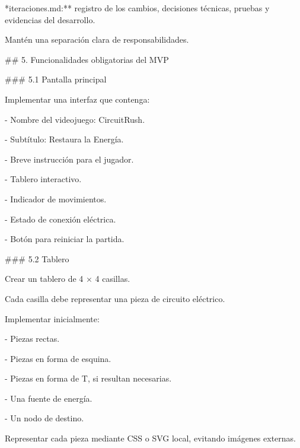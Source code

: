 \par\smallskip
\noindent **iteraciones.md:** registro de los cambios, decisiones técnicas, pruebas y evidencias del desarrollo.\par
\par\smallskip
\noindent Mantén una separación clara de responsabilidades.\par
\par\smallskip
\noindent \#\# 5. Funcionalidades obligatorias del MVP\par
\par\smallskip
\noindent \#\#\# 5.1 Pantalla principal\par
\par\smallskip
\noindent Implementar una interfaz que contenga:\par
\par\smallskip
\noindent - Nombre del videojuego: CircuitRush.\par
\noindent - Subtítulo: Restaura la Energía.\par
\noindent - Breve instrucción para el jugador.\par
\noindent - Tablero interactivo.\par
\noindent - Indicador de movimientos.\par
\noindent - Estado de conexión eléctrica.\par
\noindent - Botón para reiniciar la partida.\par
\par\smallskip
\noindent \#\#\# 5.2 Tablero\par
\par\smallskip
\noindent Crear un tablero de 4 × 4 casillas.\par
\par\smallskip
\noindent Cada casilla debe representar una pieza de circuito eléctrico.\par
\par\smallskip
\noindent Implementar inicialmente:\par
\par\smallskip
\noindent - Piezas rectas.\par
\noindent - Piezas en forma de esquina.\par
\noindent - Piezas en forma de T, si resultan necesarias.\par
\noindent - Una fuente de energía.\par
\noindent - Un nodo de destino.\par
\par\smallskip
\noindent Representar cada pieza mediante CSS o SVG local, evitando imágenes externas.\par

